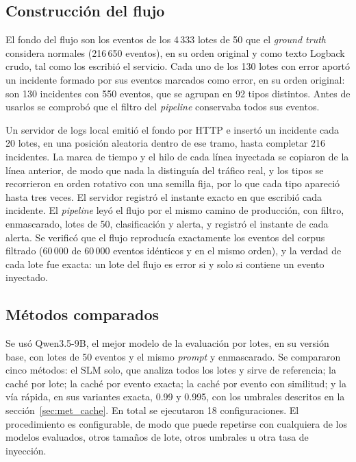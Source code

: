 
\subsection{Construcción del flujo}

El fondo del flujo son los eventos de los 4\,333 lotes de 50 que el \textit{ground truth} considera normales (216\,650 eventos), en su orden original y como texto Logback crudo, tal como los escribió el servicio. Cada uno de los 130 lotes con error aportó un incidente formado por sus eventos marcados como error, en su orden original: son 130 incidentes con 550 eventos, que se agrupan en 92 tipos distintos. Antes de usarlos se comprobó que el filtro del \textit{pipeline} conservaba todos sus eventos.

Un servidor de logs local emitió el fondo por HTTP e insertó un incidente cada 20 lotes, en una posición aleatoria dentro de ese tramo, hasta completar 216 incidentes. La marca de tiempo y el hilo de cada línea inyectada se copiaron de la línea anterior, de modo que nada la distinguía del tráfico real, y los tipos se recorrieron en orden rotativo con una semilla fija, por lo que cada tipo apareció hasta tres veces. El servidor registró el instante exacto en que escribió cada incidente. El \textit{pipeline} leyó el flujo por el mismo camino de producción, con filtro, enmascarado, lotes de 50, clasificación y alerta, y registró el instante de cada alerta. Se verificó que el flujo reproducía exactamente los eventos del corpus filtrado (60\,000 de 60\,000 eventos idénticos y en el mismo orden), y la verdad de cada lote fue exacta: un lote del flujo es error si y solo si contiene un evento inyectado.

\subsection{Métodos comparados}

Se usó Qwen3.5-9B, el mejor modelo de la evaluación por lotes, en su versión base, con lotes de 50 eventos y el mismo \textit{prompt} y enmascarado. Se compararon cinco métodos: el SLM solo, que analiza todos los lotes y sirve de referencia; la caché por lote; la caché por evento exacta; la caché por evento con similitud; y la vía rápida, en sus variantes exacta, 0.99 y 0.995, con los umbrales descritos en la sección~\ref{sec:met_cache}. En total se ejecutaron 18 configuraciones. El procedimiento es configurable, de modo que puede repetirse con cualquiera de los modelos evaluados, otros tamaños de lote, otros umbrales u otra tasa de inyección.

